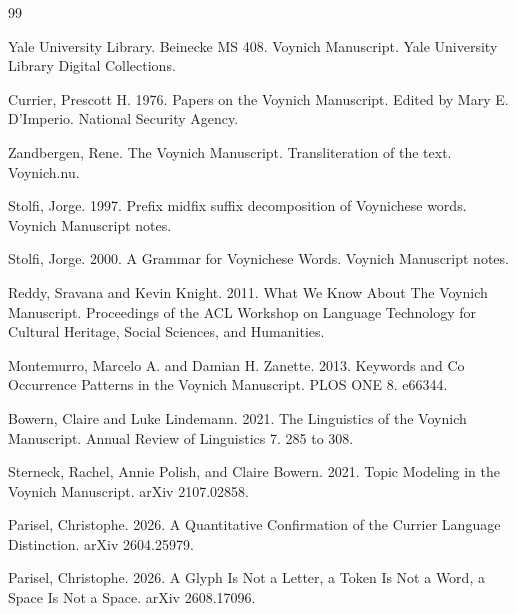 \begin{thebibliography}{99}

Yale University Library. Beinecke MS 408. Voynich Manuscript. Yale University Library Digital Collections.

Currier, Prescott H. 1976. Papers on the Voynich Manuscript. Edited by Mary E. D'Imperio. National Security Agency.

Zandbergen, Rene. The Voynich Manuscript. Transliteration of the text. Voynich.nu.

Stolfi, Jorge. 1997. Prefix midfix suffix decomposition of Voynichese words. Voynich Manuscript notes.

Stolfi, Jorge. 2000. A Grammar for Voynichese Words. Voynich Manuscript notes.

Reddy, Sravana and Kevin Knight. 2011. What We Know About The Voynich Manuscript. Proceedings of the ACL Workshop on Language Technology for Cultural Heritage, Social Sciences, and Humanities.

Montemurro, Marcelo A. and Damian H. Zanette. 2013. Keywords and Co Occurrence Patterns in the Voynich Manuscript. PLOS ONE 8. e66344.

Bowern, Claire and Luke Lindemann. 2021. The Linguistics of the Voynich Manuscript. Annual Review of Linguistics 7. 285 to 308.

Sterneck, Rachel, Annie Polish, and Claire Bowern. 2021. Topic Modeling in the Voynich Manuscript. arXiv 2107.02858.

Parisel, Christophe. 2026. A Quantitative Confirmation of the Currier Language Distinction. arXiv 2604.25979.

Parisel, Christophe. 2026. A Glyph Is Not a Letter, a Token Is Not a Word, a Space Is Not a Space. arXiv 2608.17096.

\end{thebibliography}
